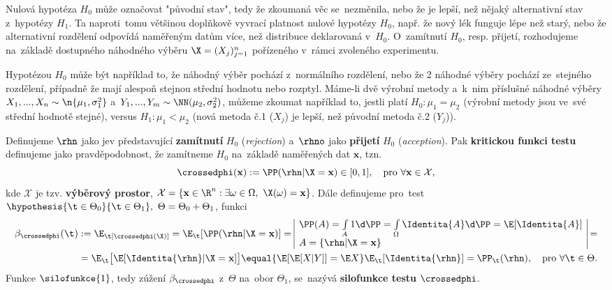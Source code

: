 Nulová hypotéza $H_0$ může označovat "původní stav", tedy že zkoumaná věc se~nezměnila, nebo že je lepší, než nějaký alternativní stav z~hypotézy $H_1$. Ta naproti~tomu  většinou doplňkově vyvrací platnost nulové hypotézy $H_0$, např. že nový lék funguje lépe než starý, nebo že alternativní rozdělení odpovídá naměřeným datům více, než distribuce deklarovaná v~$H_0$. O~zamítnutí $H_0$, resp. přijetí, rozhodujeme na~základě dostupného náhodného výběru $\X=(X_j)_{j=1}^n$ pořízeného v~rámci  zvoleného experimentu.

\begin{example}
	Hypotézou $H_0$ může být například to, že náhodný výběr pochází z~normálního rozdělení, nebo že 2 náhodné výběry pochází ze~stejného rozdělení, případně že mají alespoň stejnou střední hodnotu nebo rozptyl.
	Máme-li dvě výrobní metody a~k~nim příslušné náhodné výběry $X_1,...,X_n\sim\n{\mu_1,\sigma_1^2}$ a~$Y_1,...,Y_m\sim\NN(\mu_2,\sigma_2^2)$, můžeme zkoumat například to, jestli platí $H_0:\mu_1=\mu_2$ (výrobní metody jsou ve~své střední hodnotě stejné), versus $H_1:\mu_1<\mu_2$ (nová metoda č.1 ($X_j$) je lepší, než původní metoda č.2 ($Y_j$)).
\end{example}
\begin{define}
	Definujeme $\rhn$ jako jev představující \textbf{zamítnutí} $H_0$ (\textit{rejection}) a~$\rhno$ jako \textbf{přijetí} $H_0$ (\textit{acception}). Pak \textbf{kritickou funkci testu} definujeme jako pravděpodobnost, že zamítneme $H_0$ na~základě naměřených dat $\textbf{x}$, tzn. $$\crossedphi(\textbf{x}):=\PP(\rhn|\X=\textbf{x})\in[0,1],\quad\text{pro~}\forall\textbf{x}\in\mathcal{X},$$
	kde $\mathcal{X}$ je tzv. \textbf{výběrový prostor}, $\mathcal{X}=\{ \textbf{x}\in\R^n:\exists\omega\in\Omega,~\X(\omega)=\textbf{x} \}$. Dále definujeme pro~test $\hypothesis{\t\in\Theta_0}{\t\in\Theta_1},~\Theta=\Theta_0+\Theta_1$, funkci
	\[\begin{split}
	\beta_\crossedphi(\t)&:=\E_\t[\crossedphi(\X)]=\E_\t[\PP(\rhn|\X=\textbf{x})]=\begin{array}{|l|}
	\PP(A)=\int\limits_{A}1\d \PP=\int\limits_{\Omega}\Identita{A}\d\PP=\E[\Identita{A}]\\ A=\{\rhn|\X=\textbf{x}\} 
	\end{array}=\\&=\E_\t\big[\E[\Identita{\rhn}|\X=\textbf{x}]\big]\equal{\E[\E[X|Y]]=\E X}\E_\t[\Identita{\rhn}]=\PP_\t(\rhn),\quad\text{pro } \forall\t\in\Theta . 
	\end{split}\]
	Funkce $\silofunkce{1}$, tedy zúžení $\beta_\crossedphi$ z~$\Theta$ na~obor $\Theta_1$, se~nazývá \textbf{silofunkce testu} $\crossedphi$.
\end{define}
